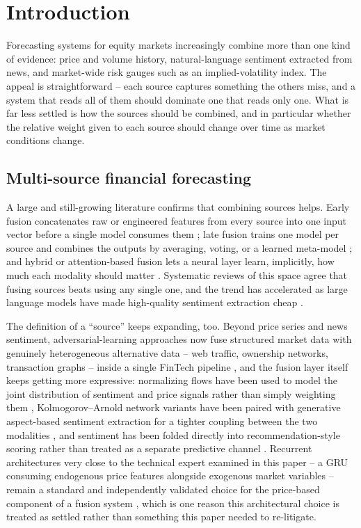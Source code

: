 \documentclass[10pt,a4paper,twocolumn]{article}
\begin{document}
\section{Introduction}

Forecasting systems for equity markets increasingly combine more than one kind of evidence: price and volume history, natural-language sentiment extracted from news, and market-wide risk gauges such as an implied-volatility index. The appeal is straightforward -- each source captures something the others miss, and a system that reads all of them should dominate one that reads only one. What is far less settled is how the sources should be combined, and in particular whether the relative weight given to each source should change over time as market conditions change.

\subsection{Multi-source financial forecasting}

A large and still-growing literature confirms that combining sources helps. Early fusion concatenates raw or engineered features from every source into one input vector before a single model consumes them \cite{moodi2024,mu2023}; late fusion trains one model per source and combines the outputs by averaging, voting, or a learned meta-model \cite{farimani2024,vargas2022}; and hybrid or attention-based fusion lets a neural layer learn, implicitly, how much each modality should matter \cite{liu2019,haryono2023}. Systematic reviews of this space \cite{zhang2022,li2020} agree that fusing sources beats using any single one, and the trend has accelerated as large language models have made high-quality sentiment extraction cheap \cite{jung2024,liu2024llm}.

The definition of a ``source'' keeps expanding, too. Beyond price series and news sentiment, adversarial-learning approaches now fuse structured market data with genuinely heterogeneous alternative data -- web traffic, ownership networks, transaction graphs -- inside a single FinTech pipeline \cite{khuwaja2023}, and the fusion layer itself keeps getting more expressive: normalizing flows have been used to model the joint distribution of sentiment and price signals rather than simply weighting them \cite{tai2022}, Kolmogorov--Arnold network variants have been paired with generative aspect-based sentiment extraction for a tighter coupling between the two modalities \cite{haryono2024}, and sentiment has been folded directly into recommendation-style scoring rather than treated as a separate predictive channel \cite{wang2024spcm}. Recurrent architectures very close to the technical expert examined in this paper -- a GRU consuming endogenous price features alongside exogenous market variables -- remain a standard and independently validated choice for the price-based component of a fusion system \cite{alsheebah2024}, which is one reason this architectural choice is treated as settled rather than something this paper needed to re-litigate.
\end{document}
